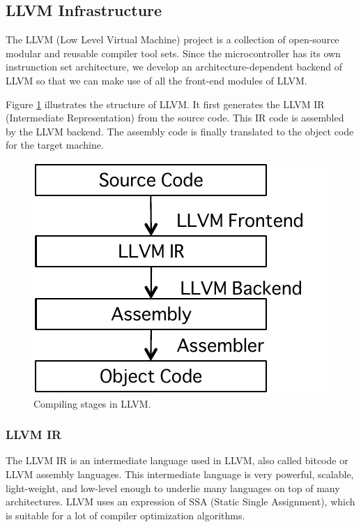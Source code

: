 \subsection{LLVM Infrastructure}

The LLVM (Low Level Virtual Machine) project is a collection of
open-source modular and reusable compiler tool sets.
Since the microcontroller has its own instrunction set architecture, we
develop an architecture-dependent backend of LLVM so that we can make
use of all the front-end modules of LLVM.

Figure \ref{fig:llvm} illustrates the structure of LLVM.
It first generates the LLVM IR (Intermediate Representation) from the
source code. 
This IR code is assembled by the LLVM backend.
The assembly code is finally translated to the object code for the
target machine.

\begin{figure}
\begin{center}
\includegraphics[scale = 0.5]{./img/llvmflow.pdf}
\end{center}
\caption{Compiling stages in LLVM.}
\label{fig:llvm}
\end{figure}

\subsubsection{LLVM IR}

The LLVM IR is an intermediate language used in LLVM, also called bitcode or
LLVM assembly languages.
This intermediate language is very powerful, scalable, light-weight, and
low-level enough to underlie many languages on top of many
architectures.
LLVM uses an expression of SSA (Static Single Assignment), which is
suitable for a lot of compiler optimization algorithms.

